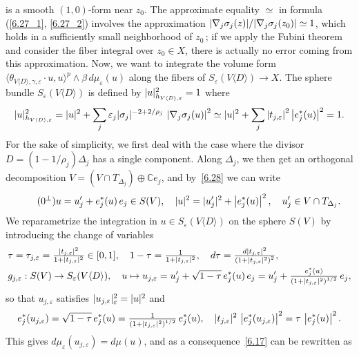 \documentclass[AHL,Unicode,longabstracts,published]{cedram}
\DeclarePairedDelimiter{\abs}{\lvert}{\rvert}
\newcommand*\bC{\mathbb{C}}
\begin{document}
is a smooth $(1,0)$-form near $z_0$. The approximate equality $\simeq$ in formula (\eqref{6.27_1}, \eqref{6.27_2}) involves the approximation $\abs{\nabla_j\sigma_j(z)}/\abs{\nabla_j\sigma_j(z_0)}\simeq 1$, which holds in a sufficiently small neighborhood of $z_0\,$; if we apply the Fubini theorem and consider the fiber integral over $z_0\in X$, there is actually no error coming from this approximation. Now, we want to integrate the volume form
$\langle\theta_{V\langle D\rangle,\gamma,\varepsilon}\cdot u,u\rangle^p \wedge\beta\,d\mu_\varepsilon(u)$ along the fibers of
$S_\varepsilon(V\langle D\rangle)\to X$. The sphere bundle $S_\varepsilon(V\langle D\rangle)$ is defined by
$\abs{u}_{h_{V\langle D\rangle,\varepsilon}}^2=1$ where
\begin{equation}\label{6.28}
\abs{u}_{h_{V\langle D\rangle,\varepsilon}}^2=
\abs{u}^2+\sum_j\varepsilon_j\abs{\sigma_j}^{-2+2/\rho_j}\,\left|\nabla_j\sigma_j(u)\right|^2
\simeq
\abs{u}^2+\sum_j\left|t_{j,\varepsilon}\right|^2\left|e_j^*(u)\right|^2=1.
\end{equation}
For the sake of simplicity, we first deal with the case where the divisor $D=(1-1/\rho_j)\Delta_j$ has a single component. Along
$\Delta_j$, we then get an orthogonal decomposition
$V=(V\cap T_{\Delta_j})\oplus\bC e_j$, and by~\eqref{6.28} we can write
\[
\tag{$\theequation^{\perp}$} u=u'_j+e_j^*(u)\,e_j\in S(V),\quad
\abs{u}^2=\abs{u'_j}^2+\left|e_j^*(u)\right|^2,\quad u'_j\in V\cap T_{\Delta_j}.
\]
We reparametrize the integration in $u\in S_\varepsilon(V\langle D\rangle)$ on the sphere $S(V)$ by introducing the change of variables
\begin{align*}
&\tau=\tau_{j,\varepsilon}=\tfrac{\abs{t_{j,\varepsilon}}^2}{ 1+\abs{t_{j,\varepsilon}}^2}
\in[0,1],\quad 1-\tau=\tfrac{1}{ 1+\abs{t_{j,\varepsilon}}^2},\quad d\tau=\tfrac{d\abs{t_{j,\varepsilon}}^2}{\left(1+\abs{t_{j,\varepsilon}}^2\right)^2},
\\
&g_{j,\varepsilon}:S(V)\to S_\varepsilon(V\langle D\rangle),\quad u\mapsto u_{j,\varepsilon}=u'_j+\sqrt{1-\tau}\,e_j^*(u)\,e_j =u'_j+\tfrac{e_j^*(u)}{\left(1+\abs{t_{j,\varepsilon}}^2\right)^{1/2}}\,e_j,
\end{align*}
so that $u_{j,\varepsilon}$ satisfies
$\abs{u_{j,\varepsilon}}^2_\varepsilon=\abs{u}^2$ and
\[
e_j^*(u_{j,\varepsilon})=\sqrt{1-\tau}\,e_j^*(u) =\tfrac{1}{\left(1+\abs{t_{j,\varepsilon}}^2\right)^{1/2}}\,e_j^*(u),
\quad
\abs{t_{j,\varepsilon}}^2\,\left|e_j^*(u_{j,\varepsilon})\right|^2=\tau\,\left|e_j^*(u)\right|^2.
\]
This gives $d\mu_\varepsilon(u_{j,\varepsilon})=d\mu(u)$, and as a consequence~\eqref{6.17} can be rewritten as
\end{document}
